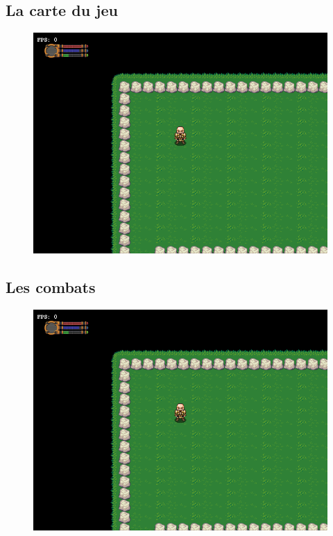 \documentclass[a4paper,titlepage]{article}
\begin{document}
	\subsection{La carte du jeu}
	\begin{figure}[h!]
		\includegraphics[scale=0.7]{EcranCarte.png}
	\end{figure}
	

	\subsection{Les combats}
	\begin{figure}[h!]
		\includegraphics[scale=0.7]{EcranCarte.png}
	\end{figure}	
	\clearpage
	
\end{document}
